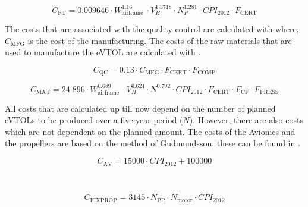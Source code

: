 \begin{equation}
    \label{eq:cost:FTcost}
    C_{\text{FT}}=0.009646 \cdot W_{\text{airframe }}^{1.16} \cdot V_H^{1.3718} \cdot N_P^{1.281} \cdot CPI_{2012} \cdot F_{\text{CERT}}
\end{equation}


The costs that are associated with the quality control are calculated with  where, $C_{\text{MFG}}$ is the cost of the manufacturing.
The costs of the raw materials that are used to manufacture the eVTOL are calculated with .

\begin{equation}
    \label{eq:cost:QCcost}
    C_{\text{QC}} = 0.13 \cdot C_{\text{MFG}} \cdot F_{\text{CERT}} \cdot F_{\text{COMP}}
\end{equation}

\begin{equation}
    \label{eq:cost:MATcost}
    C_{\text{MAT}}=24.896 \cdot W_{\text{airframe }}^{0.689} \cdot V_H^{0.624} \cdot N^{0.792} \cdot CPI_{2012} \cdot F_{\text{CERT}} \cdot F_{\text{CF}} \cdot F_{\text{PRESS}}
\end{equation}

All costs that are calculated up till now depend on the number of planned eVTOLs to be produced over a five-year period ($N$). However, there are also costs which are not dependent on the planned amount.
The costs of the Avionics and the propellers are based on the method of Gudmundsson; these can be found in .

\begin{minipage}{0.45\linewidth}
    \begin{equation}
    \label{eq:cost:AVcost}
    C_{\text{AV}} = 15000 \cdot CPI_{2012} + 100000
\end{equation}
\end{minipage}
~
\begin{minipage}{0.45\linewidth}
    \begin{equation}
    \label{eq:cost:Propcost}
    C_{\text{FIXPROP}} = 3145 \cdot N_{\text{PP}} \cdot N_{\text{motor}} \cdot CPI_{2012}
    \end{equation}
\end{minipage}

